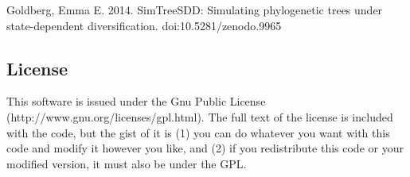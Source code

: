 \documentclass[10pt]{article}
\begin{document}
Goldberg, Emma E.
2014.
SimTreeSDD: Simulating phylogenetic trees under state-dependent diversification.
doi:10.5281/zenodo.9965

\subsection*{License}
This software is issued under the Gnu Public License (http://www.gnu.org/licenses/gpl.html).  
The full text of the license is included with the code, but the gist of it is (1) you can do whatever you want with this code and modify it however you like, and (2) if you redistribute this code or your modified version, it must also be under the GPL.
\end{document}
